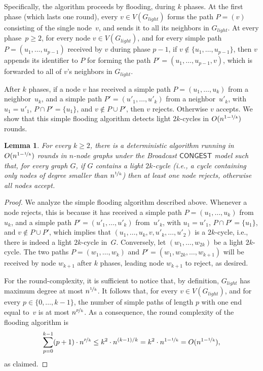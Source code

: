 \documentclass{article}
\newcommand{\CONGEST}{\textsf{CONGEST}}
\newtheorem{lemma}{Lemma}
\begin{document}
Specifically, the algorithm proceeds by flooding, during $k$ phases. At the first phase (which lasts one round), every $v\in V(G_{light})$ forms the path $P=(v)$ consisting of the single node~$v$, and sends it to all its neighbors in $G_{light}$. At every phase~$p\geq 2$, for every node $v \in V(G_{light})$, and for every simple path $P=(u_1,\dots,u_{p-1})$ received by $v$ during phase $p-1$, if $v\notin \{u_1,\dots,u_{p-1}\}$, then $v$ appends its identifier to $P$ for forming the path $P'=(u_1,\dots,u_{p-1},v)$, which is forwarded to all of $v$'s neighbors in $G_{light}$. 

After $k$ phases, if a node $v$ has received a simple path $P=(u_1,\dots,u_k)$ from a neighbor~$u_k$, and a simple path $P'=(u'_1,\dots,u'_k)$ from a neighbor~$u'_k$, with $u_1=u'_1$, $P\cap P'=\{u_1\}$, and $v\notin P\cup P'$, then $v$ rejects. Otherwise $v$ accepts. We show that this simple flooding algorithm detects light $2k$-cycles in $O(n^{1-\nicefrac{1}{k}})$ rounds. 

\begin{lemma}\label{lem:complexity-light-cycles}
    For every $k\geq 2$, there is a deterministic algorithm running in $O(n^{1-\nicefrac{1}{k}})$ rounds in $n$-node graphs under the Broadcast $\CONGEST$ model  such that, for every graph $G$, if $G$ contains a \emph{light} $2k$-cycle (i.e., a cycle containing only nodes of degree smaller than $n^{\nicefrac{1}{k}}$) then at least one node rejects, otherwise all nodes accept.   
\end{lemma}

\begin{proof}
We analyze the simple flooding algorithm described above. Whenever a node rejects, this is because it has received a simple path $P=(u_1,\dots,u_k)$ from~$u_k$, and a simple path $P'=(u'_1,\dots,u'_k)$ from~$u'_k$, with $u_1=u'_1$, $P\cap P'=\{u_1\}$, and $v\notin P\cup P'$, which implies that $(u_1,\dots,u_k,v,u'_k,\dots,u'_2)$ is a $2k$-cycle, i.e., there is indeed a light $2k$-cycle in~$G$. Conversely, let $(w_1,\dots,w_{2k})$ be a light $2k$-cycle. The two paths $P=(w_1,\dots,w_k)$ and $P'=(w_1,w_{2k},\dots,w_{k+1})$ will be received by node $w_{k+1}$ after $k$ phases, leading node $w_{k+1}$ to reject, as desired. 

For the round-complexity, it is sufficient to notice that, by definition, $G_{light}$ has maximum degree at most $n^{\nicefrac{1}{k}}$. It follows that, for every $v\in V(G_{light})$, and for every $p\in\{0,\dots,k-1\}$, the number of simple paths of length $p$ with one end equal to~$v$ is at most  $n^{\nicefrac{p}{k}}$. As a consequence, the round complexity of the flooding algorithm is 
\[
\sum_{p=0}^{k-1} (p+1)\cdot n^{\nicefrac{p}{k}} \leq k^2 \cdot n^{(k-1)/k} = k^2 \cdot  n^{1-\nicefrac{1}{k}}=O(n^{1-\nicefrac{1}{k}}),
\]
as claimed. 
\end{proof}
\end{document}
